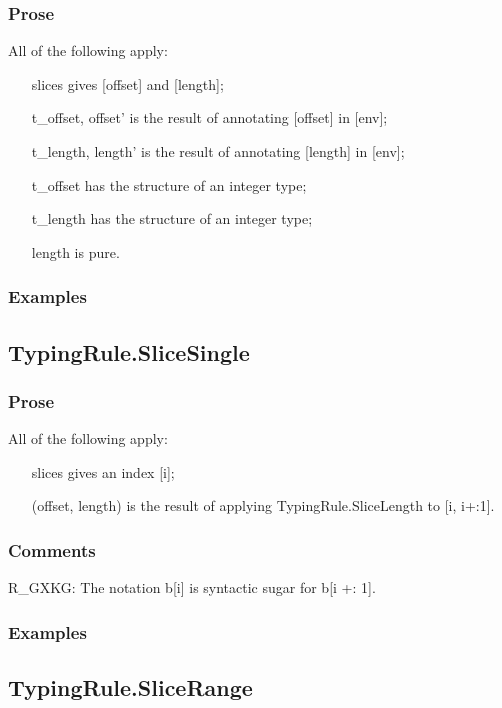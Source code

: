 \documentclass{book}
\begin{document}
    \subsubsection{Prose}
    All of the following apply:
   \begin{itemize}
   \item [slices] gives [offset] and [length]; 
   \item [t\_offset, offset'] is the result of annotating [offset] in [env];
   \item [t\_length, length'] is the result of annotating [length] in [env];
   \item [t\_offset] has the structure of an integer type;
   \item [t\_length] has the structure of an integer type;
   \item [length] is pure.
   \end{itemize}

    \subsubsection{Examples}

\subsection{TypingRule.SliceSingle}

    \subsubsection{Prose}
    All of the following apply: 
   \begin{itemize}
   \item [slices] gives an index [i];
   \item [(offset, length)] is the result of applying TypingRule.SliceLength to [i, i+:1].
   \end{itemize}

    \subsubsection{Comments}
    R\_GXKG: The notation b[i] is syntactic sugar for b[i +: 1].

    \subsubsection{Examples}

\subsection{TypingRule.SliceRange}
\end{document}
